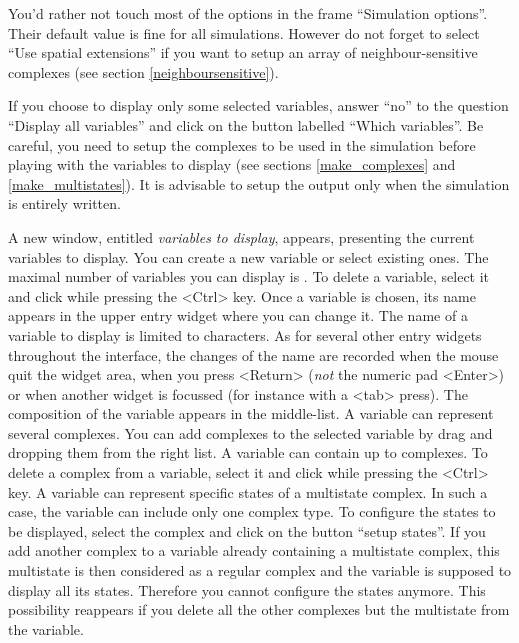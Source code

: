 You'd rather not touch most of the options in the frame ``Simulation options''.
Their default value is fine for all simulations. However do not forget to
select ``Use spatial extensions'' if you want to setup an array of
neighbour-sensitive complexes (see section \ref{neighboursensitive}). 

If you choose to display only some selected variables, answer ``no'' to the
question ``Display all variables'' and click on the button labelled ``Which
variables''.  Be careful, you need to setup the complexes to be used in the
simulation before playing with the variables to display (see sections
\ref{make_complexes} and \ref{make_multistates}). It is advisable to setup the
output only when the simulation is entirely written.

 A new window, entitled
\emph{variables to display}, appears, presenting the current variables to
display. You can create a new variable or select existing ones. The maximal
number of variables you can display is \MAXNUMDISPLAYVARIABLES. To delete a
variable, select it and click while pressing the <Ctrl> key. Once a variable is
chosen, its name appears in the upper entry widget where you can change it.
The name of a variable to display is limited to \MAXOUTPUTVARNAMELENGTH{} characters.
As for several other entry widgets throughout the interface, the changes
of the name are recorded when the mouse quit the widget area, when you press
<Return> (\emph{not} the numeric pad <Enter>) or when another widget is focussed
(for instance with a <tab> press). The composition of the variable appears in
the middle-list. A variable can represent several complexes. You can add
complexes to the selected variable by drag and dropping them from the right
list. A variable can contain up to \MAXTYPESINOUTPUTVAR{} complexes. To delete a
complex from a variable, select it and click while pressing the <Ctrl> key. A
variable can represent specific states of a multistate complex. In such a case,
the variable can include only one complex type. To configure the states to be
displayed, select the complex and click on the button ``setup states''. If you
add another complex to a variable already containing a multistate complex, this
multistate is then considered as a regular complex and the variable is supposed
to display all its states. Therefore you cannot configure the states anymore.
This possibility reappears if you delete all the other complexes but the
multistate from the variable.


